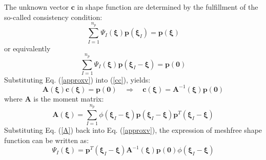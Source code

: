 The unknown vector $\boldsymbol c$ in shape function are determined by the fulfillment of the so-called consistency condition:
\begin{equation}
\sum_{I=1}^{n_p} \Psi_I(\boldsymbol \xi)\boldsymbol p(\boldsymbol \xi_I) = \boldsymbol p(\boldsymbol \xi)
\end{equation}
or equivalently
\begin{equation}\label{cc}
\sum_{I=1}^{n_p} \Psi_I(\boldsymbol \xi)\boldsymbol p(\boldsymbol \xi_I-\boldsymbol \xi) = \boldsymbol p(\boldsymbol 0)
\end{equation}
Substituting Eq. (\ref{approxv}) into (\ref{cc}), yields:
\begin{equation}\label{A}
\boldsymbol A(\boldsymbol \xi) \boldsymbol c(\boldsymbol \xi) = \boldsymbol p(\boldsymbol 0)\quad \Rightarrow \quad
\boldsymbol c(\boldsymbol \xi) = \boldsymbol A^{-1}(\boldsymbol \xi)\boldsymbol p(\boldsymbol 0)
\end{equation}
where $\boldsymbol A$ is the moment matrix:
\begin{equation}
\boldsymbol A(\boldsymbol \xi) = \sum_{I=1}^{n_p}\phi(\boldsymbol \xi_I - \boldsymbol \xi) \boldsymbol p(\boldsymbol \xi_I-\boldsymbol \xi)\boldsymbol p^T(\boldsymbol \xi_I - \boldsymbol \xi)
\end{equation}
Substituting Eq. (\ref{A}) back into Eq. (\ref{approxv}), the expression of meshfree shape function can be written as:
\begin{equation}
\Psi_I(\boldsymbol \xi) = \boldsymbol p^T(\boldsymbol \xi_I - \boldsymbol \xi)\boldsymbol A^{-1}(\boldsymbol \xi) \boldsymbol p(\boldsymbol 0) \phi(\boldsymbol \xi_I-\boldsymbol \xi)
\end{equation}
